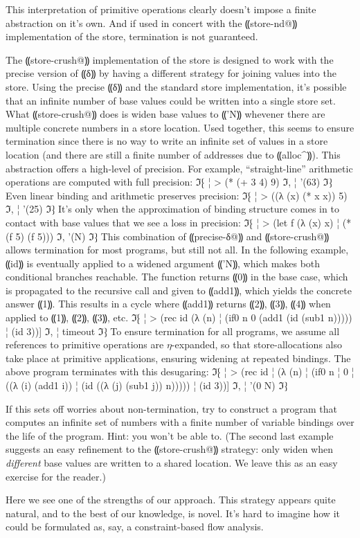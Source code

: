 This interpretation of primitive operations clearly doesn't impose a
finite abstraction on it's own.  And if used in concert with the
⸨store-nd@⸩ implementation of the store, termination is not
guaranteed.  

The ⸨store-crush@⸩ implementation of the store is designed to
work with the precise version of ⸨δ⸩ by having a different
strategy for joining values into the store.  Using the precise
⸨δ⸩ and the standard store implementation, it's possible that
an infinite number of base values could be written into a single store
set.  What ⸨store-crush@⸩ does is widen base values to
⸨'N⸩ whevener there are multiple concrete numbers in a store
location.  Used together, this seems to ensure termination
since there is no way to write an infinite set of values in a
store location (and there are still a finite number of addresses due
to ⸨alloc^⸩).  This abstraction offers a
high-level of precision.  For example, ``straight-line'' arithmetic
operations are computed with full precision:
ℑ⁅
¦ > (* (+ 3 4) 9)
ℑ,
¦ '(63)
ℑ⁆
Even linear binding and arithmetic preserves precision:
ℑ⁅
¦ > ((λ (x) (* x x)) 5)
ℑ,
¦ '(25)
ℑ⁆
It's only when the approximation of binding structure comes in to
contact with base values that we see a loss in precision:
ℑ⁅
¦ > (let f (λ (x) x)
¦     (* (f 5) (f 5)))
ℑ,
'(N)
ℑ⁆
This combination of ⸨precise-δ@⸩ and ⸨store-crush@⸩ allows termination
for most programs, but still not all.
In the following example, ⸨id⸩ is eventually applied to a widened argument ⸨'N⸩,
which makes both conditional branches reachable.
The function returns ⸨0⸩ in the base case,
which is propagated to the recursive call and given to ⸨add1⸩,
which yields the concrete answer ⸨1⸩.
This results in a cycle where ⸨add1⸩ returns ⸨2⸩, ⸨3⸩, ⸨4⸩
when applied to ⸨1⸩, ⸨2⸩, ⸨3⸩, etc.
ℑ⁅
¦ > (rec id (λ (n)
¦             (if0 n 0 (add1 (id (sub1 n)))))
¦     (id 3))]
ℑ,
¦ timeout
ℑ⁆
To ensure termination for all programs, we assume all references
to primitive operations are $η$-expanded, so that store-allocations also take place
at primitive applications, ensuring widening at repeated bindings.
The above program terminates with this desugaring:
ℑ⁅
¦ > (rec id
¦        (λ (n)
¦         (if0 n
¦              0
¦              ((λ (i) (add1 i))
¦               (id ((λ (j) (sub1 j)) n)))))
¦     (id 3))]
ℑ,
¦ '(0 N)
ℑ⁆


If this sets off worries about non-termination, try to construct a
program that computes an infinite set of numbers with a finite number
of variable bindings over the life of the program.  Hint: you won't be
able to.  (The second last example suggests an easy refinement to the
⸨store-crush@⸩ strategy: only widen when \emph{different} base
values are written to a shared location.  We leave this as an easy
exercise for the reader.)

Here we see one of the strengths of our approach.  This strategy
appears quite natural, and to the best of our knowledge, is novel.
It's hard to imagine how it could be formulated as, say, a
constraint-based flow analysis.
